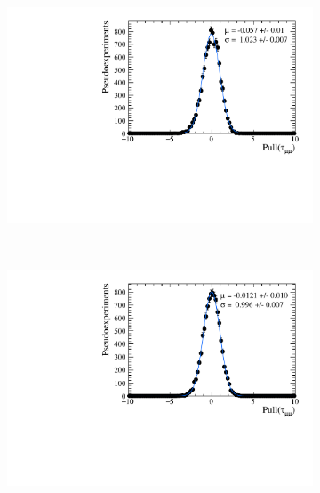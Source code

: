 {\begin{figure}[htbp]
    \centering
   \begin{subfigure}[b]{0.48\textwidth}
        \includegraphics[width= \textwidth]{./Figs/LifetimeMeasurement/50fb_simple_tau_pull.pdf}
    \end{subfigure}
   ~ %
    \begin{subfigure}[b]{0.48\textwidth}
       \includegraphics[width=\textwidth]{./Figs/LifetimeMeasurement/300fb_simple_tau_pull.pdf}

\end{subfigure}
\end{figure}}
